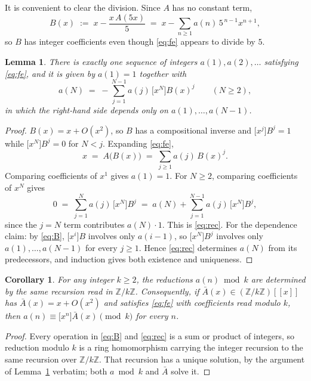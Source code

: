 \documentclass[11pt,a4paper]{article}
\theoremstyle{plain}
\newtheorem{lemma}[theorem]{Lemma}
\newtheorem{corollary}[theorem]{Corollary}
\theoremstyle{definition}
\begin{document}
It is convenient to clear the division. Since $A$ has no constant term,
\begin{equation}\label{eq:B}
B(x)\;:=\;x-\frac{x\,A(5x)}{5}\;=\;x-\sum_{n\ge1}a(n)\,5^{\,n-1}x^{n+1},
\end{equation}
so $B$ has integer coefficients even though \eqref{eq:fe} appears to divide by $5$.

\begin{lemma}\label{lem:unique}
There is exactly one sequence of integers $a(1),a(2),\dots$ satisfying \eqref{eq:fe}, and
it is given by $a(1)=1$ together with
\begin{equation}\label{eq:rec}
a(N)\;=\;-\sum_{j=1}^{N-1}a(j)\,\bigl[x^{N}\bigr]B(x)^{j}\qquad(N\ge2),
\end{equation}
in which the right-hand side depends only on $a(1),\dots,a(N-1)$.
\end{lemma}

\begin{proof}
$B(x)=x+O(x^{2})$, so $B$ has a compositional inverse and $\bigl[x^{j}\bigr]B^{j}=1$
while $\bigl[x^{N}\bigr]B^{j}=0$ for $N<j$. Expanding \eqref{eq:fe},
\[
x\;=\;A\bigl(B(x)\bigr)\;=\;\sum_{j\ge1}a(j)\,B(x)^{j} .
\]
Comparing coefficients of $x^{1}$ gives $a(1)=1$. For $N\ge2$, comparing coefficients of
$x^{N}$ gives
\[
0\;=\;\sum_{j=1}^{N}a(j)\,\bigl[x^{N}\bigr]B^{j}
\;=\;a(N)+\sum_{j=1}^{N-1}a(j)\,\bigl[x^{N}\bigr]B^{j},
\]
since the $j=N$ term contributes $a(N)\cdot1$. This is \eqref{eq:rec}. For the dependence
claim: by \eqref{eq:B}, $\bigl[x^{i}\bigr]B$ involves only $a(i-1)$, so
$\bigl[x^{N}\bigr]B^{j}$ involves only $a(1),\dots,a(N-1)$ for every $j\ge1$. Hence
\eqref{eq:rec} determines $a(N)$ from its predecessors, and induction gives both existence
and uniqueness.
\end{proof}

\begin{corollary}\label{cor:mod}
For any integer $k\ge2$, the reductions $a(n)\bmod k$ are determined by the same recursion
read in $\mathbb{Z}/k\mathbb{Z}$. Consequently, if $\bar A(x)\in(\mathbb{Z}/k\mathbb{Z})[[x]]$ has
$\bar A(x)=x+O(x^{2})$ and satisfies \eqref{eq:fe} with coefficients read modulo $k$, then
$a(n)\equiv\bigl[x^{n}\bigr]\bar A(x) \pmod k$ for every $n$.
\end{corollary}

\begin{proof}
Every operation in \eqref{eq:B} and \eqref{eq:rec} is a sum or product of integers, so
reduction modulo $k$ is a ring homomorphism carrying the integer recursion to the same
recursion over $\mathbb{Z}/k\mathbb{Z}$. That recursion has a unique solution, by the argument of
Lemma~\ref{lem:unique} verbatim; both $a\bmod k$ and $\bar A$ solve it.
\end{proof}
\end{document}
